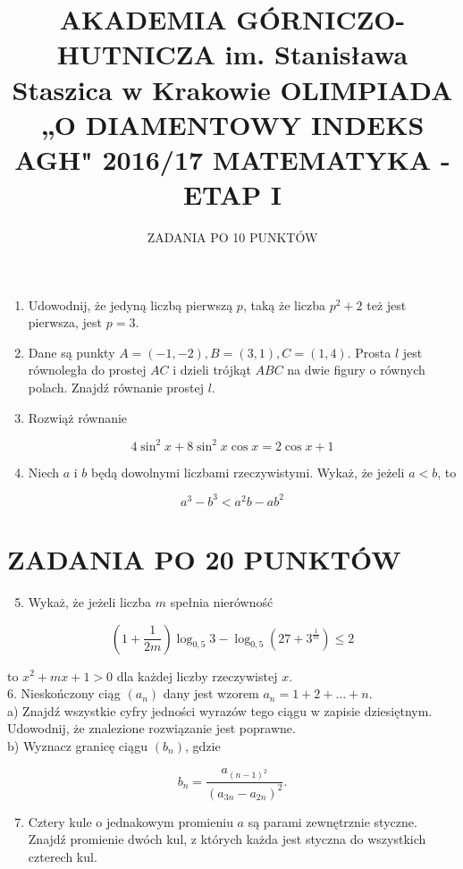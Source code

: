 \documentclass[10pt]{article}
\title{AKADEMIA GÓRNICZO-HUTNICZA im. Stanisława Staszica w Krakowie OLIMPIADA „O DIAMENTOWY INDEKS AGH" 2016/17 MATEMATYKA - ETAP I }
\author{ZADANIA PO 10 PUNKTÓW}
\date{}
\begin{document}
\maketitle


\begin{enumerate}
  \item Udowodnij, że jedyną liczbą pierwszą $p$, taką że liczba $p^{2}+2$ też jest pierwsza, jest $p=3$.
  \item Dane są punkty $A=(-1,-2), B=(3,1), C=(1,4)$. Prosta $l$ jest równoległa do prostej $A C$ i dzieli trójkąt $A B C$ na dwie figury o równych polach. Znajdź równanie prostej $l$.
  \item Rozwiąż równanie
\end{enumerate}

$$
4 \sin ^{2} x+8 \sin ^{2} x \cos x=2 \cos x+1
$$

\begin{enumerate}
  \setcounter{enumi}{3}
  \item Niech $a$ i $b$ będą dowolnymi liczbami rzeczywistymi. Wykaż, że jeżeli $a<b$, to
\end{enumerate}

$$
a^{3}-b^{3}<a^{2} b-a b^{2}
$$

\section*{ZADANIA PO 20 PUNKTÓW}
\begin{enumerate}
  \setcounter{enumi}{4}
  \item Wykaż, że jeżeli liczba $m$ spełnia nierówność
\end{enumerate}

$$
\left(1+\frac{1}{2 m}\right) \log _{0,5} 3-\log _{0,5}\left(27+3^{\frac{1}{m}}\right) \leqslant 2
$$

to $x^{2}+m x+1>0$ dla każdej liczby rzeczywistej $x$.\\
6. Nieskończony ciąg $\left(a_{n}\right)$ dany jest wzorem $a_{n}=1+2+\ldots+n$.\\
a) Znajdź wszystkie cyfry jedności wyrazów tego ciągu w zapisie dziesiętnym. Udowodnij, że znalezione rozwiązanie jest poprawne.\\
b) Wyznacz granicę ciągu $\left(b_{n}\right)$, gdzie

$$
b_{n}=\frac{a_{(n-1)^{2}}}{\left(a_{3 n}-a_{2 n}\right)^{2}} .
$$

\begin{enumerate}
  \setcounter{enumi}{6}
  \item Cztery kule o jednakowym promieniu $a$ są parami zewnętrznie styczne. Znajdź promienie dwóch kul, z których każda jest styczna do wszystkich czterech kul.
\end{enumerate}
\end{document}
